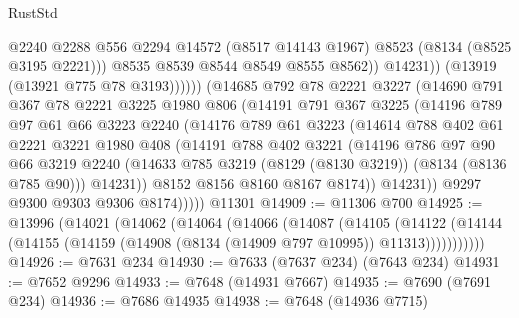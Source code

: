 \begin{lexlean}{RustStd}
\begin{coremodule}
                            @2240
                            @2288
                            @556
                            @2294
                            @14572
                            (@8517 @14143 @1967)
                            @8523
                            (@8134 (@8525 @3195 @2221)))
                          @8535
                          @8539
                          @8544
                          @8549
                          @8555
                          @8562))
                      @14231))
                  (@13919 (@13921 @775 @78 @3193))))))
          (@14685
            @792
            @78
            @2221
            @3227
            (@14690
              @791
              @367
              @78
              @2221
              @3225
              @1980
              @806
              (@14191
                @791
                @367
                @3225
                (@14196
                  @789
                  @97
                  @61
                  @66
                  @3223
                  @2240
                  (@14176
                    @789
                    @61
                    @3223
                    (@14614
                      @788
                      @402
                      @61
                      @2221
                      @3221
                      @1980
                      @408
                      (@14191
                        @788
                        @402
                        @3221
                        (@14196
                          @786
                          @97
                          @90
                          @66
                          @3219
                          @2240
                          (@14633 @785 @3219 (@8129 (@8130 @3219)) (@8134 (@8136 @785 @90)))
                          @14231))
                      @8152
                      @8156
                      @8160
                      @8167
                      @8174))
                  @14231))
              @9297
              @9300
              @9303
              @9306
              @8174)))))
    @11301
@14909 := @11306 @700
@14925 := @13996
    (@14021
      (@14062
        (@14064
          (@14066
            (@14087
              (@14105
                (@14122
                  (@14144 (@14155 (@14159 (@14908 (@8134 (@14909 @797 @10995)) @11313)))))))))))
@14926 := @7631 @234
@14930 := @7633 (@7637 @234) (@7643 @234)
@14931 := @7652 @9296
@14933 := @7648 (@14931 @7667)
@14935 := @7690 (@7691 @234)
@14936 := @7686 @14935
@14938 := @7648 (@14936 @7715)

\end{coremodule}
\end{lexlean}

